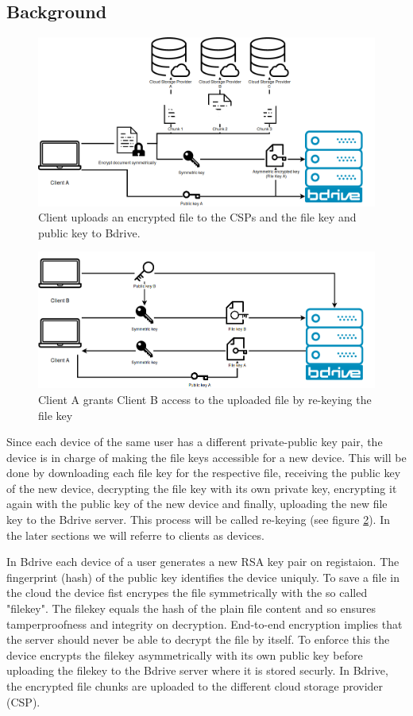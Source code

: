 \subsection{Background}
\begin{figure}[!ht]
\centering
    \includegraphics[width=0.8\linewidth]{img/bdrive1.png}\par 
    \caption{Client uploads an encrypted file to the \ac{CSP}s and the file key and public key to Bdrive.}
    \label{fig:filekey}
\end{figure}
\begin{figure}[!ht]
\centering
    \includegraphics[width=0.8\linewidth]{img/bdrive2.png}\par
    \caption{Client A grants Client B access to the uploaded file by re-keying the file key}
    \label{fig:rekey}
\end{figure}
Since each device of the same user has a different private-public key pair, the device is in charge of making the file keys accessible for a new device. This will be done by downloading each file key for the respective file, receiving the public key of the new device, decrypting the file key with its own private key, encrypting it again with the public key of the new device and finally, uploading the new file key to the Bdrive server. This process will be called re-keying (see figure \ref{fig:rekey}). In the later sections we will referre to clients as devices. 

In Bdrive each device of a user generates a new \ac{RSA} key pair on registaion. The fingerprint (hash) of the public key identifies the device uniquly. To save a file in the cloud the device fist encrypes the file symmetrically with the so called "filekey". The filekey equals the hash of the plain file content and so ensures tamperproofness and integrity on decryption. End-to-end encryption implies that the server should never be able to decrypt the file by itself. To enforce this the device encrypts the filekey asymmetrically with its own public key before uploading the filekey to the Bdrive server where it is stored securly. In Bdrive, the encrypted file chunks are uploaded to the different cloud storage provider (\ac{CSP}). 

